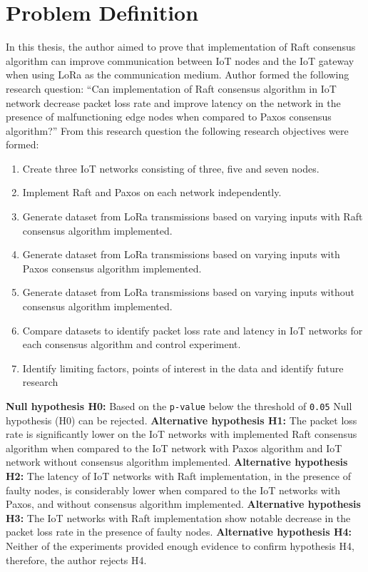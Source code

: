 \documentclass[oneside,12pt]{book}
\begin{document}
\section{Problem Definition}
In this thesis, the author aimed to prove that implementation of Raft consensus algorithm can improve communication between IoT nodes and the IoT gateway when using LoRa as the communication medium. Author formed the following research question: “Can implementation of Raft consensus algorithm in IoT network decrease packet loss rate and improve latency on the network in the presence of malfunctioning edge nodes when compared to Paxos consensus algorithm?” From this research question the following research objectives were formed:
\begin{enumerate}
  \item Create three IoT networks consisting of three, five and seven nodes.
  \item Implement Raft and Paxos on each network independently.
  \item Generate dataset from LoRa transmissions based on varying inputs with Raft consensus algorithm implemented.
  \item Generate dataset from LoRa transmissions based on varying inputs with Paxos consensus algorithm implemented.
  \item Generate dataset from LoRa transmissions based on varying inputs without consensus algorithm implemented.
  \item Compare datasets to identify packet loss rate and latency in IoT networks for each consensus algorithm and control experiment. 
  \item Identify limiting factors, points of interest in the data and identify future research
\end{enumerate}
\textbf{Null hypothesis H0: }\smallskip \newline
Based on the \texttt{p-value} below the threshold of \texttt{0.05} Null hypothesis (H0) can be rejected.\smallskip \newline 
\textbf{Alternative hypothesis H1: }\smallskip \newline
The packet loss rate is significantly lower on the IoT networks with implemented Raft consensus algorithm when compared to the IoT network with Paxos algorithm and IoT network without consensus algorithm implemented.\smallskip \newline 
\textbf{Alternative hypothesis H2: }\smallskip \newline
The latency of IoT networks with Raft implementation, in the presence of faulty nodes, is considerably lower when compared to the IoT networks with Paxos, and without consensus algorithm implemented.\smallskip \newline 
\textbf{Alternative hypothesis H3: }\smallskip \newline
The IoT networks with Raft implementation show notable decrease in the packet loss rate in the presence of faulty nodes.\smallskip \newline
\textbf{Alternative hypothesis H4:  }\smallskip \newline
Neither of the experiments provided enough evidence to confirm hypothesis H4, therefore, the author rejects H4.
\end{document}
